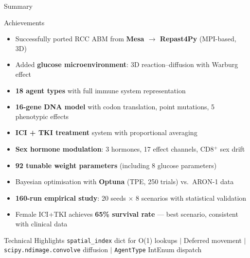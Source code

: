 \documentclass[aspectratio=169,10pt]{beamer}
\begin{document}
\begin{frame}{Summary}
  \begin{block}{Achievements}
    \begin{itemize}
      \item Successfully ported RCC ABM from \textbf{Mesa $\to$ Repast4Py} (MPI-based, 3D)
      \item Added \textbf{glucose microenvironment}: 3D reaction--diffusion with Warburg effect
      \item \textbf{18 agent types} with full immune system representation
      \item \textbf{16-gene DNA model} with codon translation, point mutations, 5 phenotypic effects
      \item \textbf{ICI + TKI treatment} system with proportional averaging
      \item \textbf{Sex hormone modulation}: 3 hormones, 17 effect channels, CD8$^+$ sex drift
      \item \textbf{92 tunable weight parameters} (including 8 glucose parameters)
      \item Bayesian optimisation with \textbf{Optuna} (TPE, 250 trials) vs.\ ARON-1 data
      \item \textbf{160-run empirical study}: 20 seeds $\times$ 8 scenarios with statistical validation
      \item Female ICI+TKI achieves \textbf{65\% survival rate} --- best scenario, consistent with clinical data
    \end{itemize}
  \end{block}

  \begin{block}{Technical Highlights}
    \centering\small
    \texttt{spatial\_index} dict for O(1) lookups \quad$|$\quad
    Deferred movement \quad$|$\quad
    \texttt{scipy.ndimage.convolve} diffusion \quad$|$\quad
    \texttt{AgentType} IntEnum dispatch
  \end{block}
\end{frame}
\end{document}
